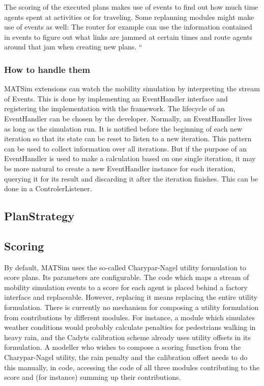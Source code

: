 The scoring of the executed plans makes use of events to find out how much time agents spent at activities or for traveling. Some replanning modules might make use of events as well: The router for example can use the information contained in events to figure out what links are jammed at certain times and route agents around that jam when creating new plans.
``

\subsubsection{How to handle them}
MATSim extensions can watch the mobility simulation by interpreting the stream of Events. This is done
by implementing an EventHandler interface and registering the implementation with the framework. The lifecycle of
an EventHandler can be chosen by the developer. Normally, an EventHandler lives as long as the simulation run.
It is notified before the beginning of each new iteration so that its state can be reset to listen to a new
iteration. This pattern can be used to collect information over all iterations. But if the purpose of
an EventHandler is used to make a calculation based on one single iteration, it may be more natural
to create a new EventHandler instance for each iteration, querying it for its result and discarding it
after the iteration finishes. This can be done in a ControlerListener.
\subsection{PlanStrategy}

\subsection{Scoring}
By default, MATSim uses the so-called Charypar-Nagel utility formulation to score plans. Its parameters
are configurable.
The code which maps a stream of mobility simulation events to a score for each agent is placed behind a factory
 interface and replaceable. However, replacing it means replacing the entire utility formulation. There is
 currently no mechanism for composing a utility formulation from contributions by different modules.
 For instance, a module which simulates weather conditions would probably calculate penalties for pedestrians
  walking in heavy rain, and the Cadyts calibration scheme already uses utility offsets in its formulation. A modeller
  who wishes to compose a scoring function from the Charypar-Nagel utility, the rain penalty and the calibration offset
  needs to do this manually, in code, accessing the code of all three modules contributing to the score and (for instance) summing
  up their contributions.

